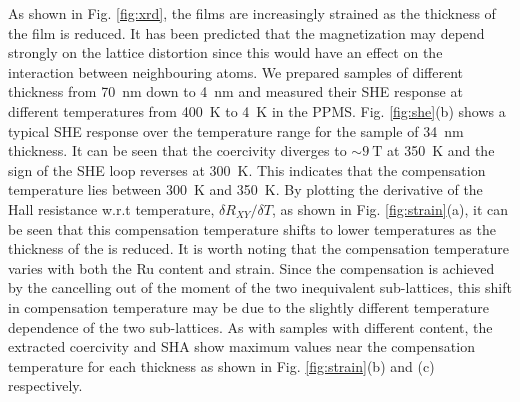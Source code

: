 \documentclass[reprint,aip,apl,floatfix,linenumbers,superscriptaddress]{revtex4-1}
\begin{document}
As shown in Fig. \ref{fig:xrd}, the  films are increasingly strained as the thickness of the film is reduced. It has been predicted that the magnetization may depend strongly on the lattice distortion since this would have an effect on the interaction between neighbouring  atoms. We prepared  samples of different thickness from \SI{70}{\nano\metre} down to \SI{4}{\nano\metre} and measured their SHE response at different temperatures from \SI{400}{\kelvin} to \SI{4}{\kelvin} in the PPMS. Fig. \ref{fig:she}(b) shows a typical SHE response over the temperature range for the sample of \SI{34}{\nano\metre} thickness. It can be seen that the coercivity diverges to $\sim\SI{9}{\tesla}$ at \SI{350}{\kelvin} and the sign of the SHE loop reverses at \SI{300}{\kelvin}. This indicates that the compensation temperature lies between \SI{300}{\kelvin} and \SI{350}{\kelvin}.  By plotting the derivative of the Hall resistance w.r.t temperature, $\delta R_{XY}/\delta T$, as shown in Fig. \ref{fig:strain}(a), it can be seen that this compensation temperature shifts to lower temperatures as the thickness of the  is reduced. It is worth noting that the compensation temperature varies with both the Ru content and strain. Since the compensation is achieved by the cancelling out of the moment of the two inequivalent  sub-lattices, this shift in compensation temperature may be due to the slightly different temperature dependence of the two sub-lattices. As with samples with different  content, the extracted coercivity and SHA show maximum values near the compensation temperature for each thickness as shown in Fig. \ref{fig:strain}(b) and (c) respectively.
\end{document}
